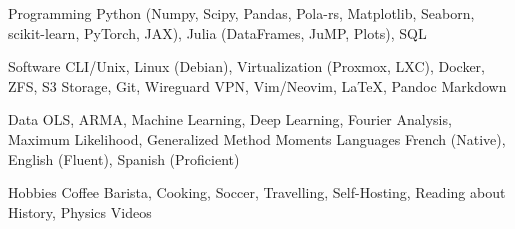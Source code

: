 

\begin{cvskills}

	\cvskill
	{Programming} %
	{Python (Numpy, Scipy, Pandas, Pola-rs, Matplotlib, Seaborn, scikit-learn, PyTorch, JAX), Julia (DataFrames, JuMP, Plots), SQL} %

	\cvskill
	{Software}
	{CLI/Unix, Linux (Debian), Virtualization (Proxmox, LXC), Docker, ZFS, S3 Storage, Git, Wireguard VPN, Vim/Neovim, \LaTeX, Pandoc Markdown}

	\cvskill
	{Data}
	{OLS, ARMA, Machine Learning, Deep Learning, Fourier Analysis, Maximum Likelihood, Generalized Method Moments}
	\cvskill
	{Languages} %
	{French (Native), English (Fluent), Spanish (Proficient)} %

	\cvskill
	{Hobbies}
	{Coffee Barista, Cooking, Soccer, Travelling, Self-Hosting, Reading about History, Physics Videos}
\end{cvskills}
